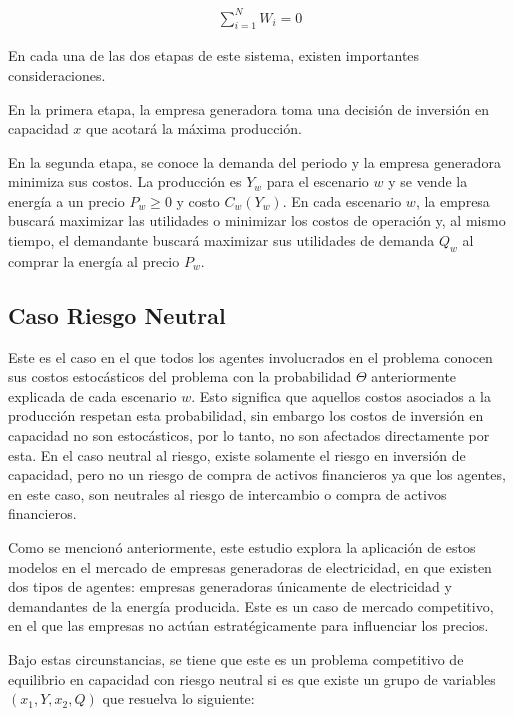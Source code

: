 \begin{align}
\sum_{i=1}^{N}W_{i} = 0    
\end{align}


En cada una de las dos etapas de este sistema, existen importantes consideraciones.
\vspace{2.5mm}

En la primera etapa, la empresa generadora toma una decisión de inversión en capacidad $x$ que acotará la máxima producción. 
\vspace{2.5mm}

En la segunda etapa, se conoce la demanda del periodo y la empresa generadora minimiza sus costos. La producción es $Y_{w}$ para el escenario $w$ y se vende la energía a un precio $P_{w}\geq 0$ y costo $C_{w}(Y_{w})$. En cada escenario $w$, la empresa buscará maximizar las utilidades o minimizar los costos de operación y, al mismo tiempo, el demandante buscará maximizar sus utilidades de demanda $Q_{w}$ al comprar la energía al precio $P_{w}$.

\subsection{Caso Riesgo Neutral}

Este es el caso en el que todos los agentes involucrados en el problema conocen sus costos estocásticos del problema con la probabilidad $\Theta$ anteriormente explicada de cada escenario $w$. Esto significa que aquellos costos asociados a la producción respetan esta probabilidad, sin embargo los costos de inversión en capacidad no son estocásticos, por lo tanto, no son afectados directamente por esta. En el caso neutral al riesgo, existe solamente el riesgo en inversión de capacidad, pero no un riesgo de compra de activos financieros ya que los agentes, en este caso, son neutrales al riesgo de intercambio o compra de activos financieros. 
\vspace{2.5mm}

Como se mencionó anteriormente, este estudio explora la aplicación de estos modelos en el mercado de empresas generadoras de electricidad, en que existen dos tipos de agentes: empresas generadoras únicamente de electricidad y demandantes de la energía producida. Este es un caso de mercado competitivo, en el que las empresas no actúan estratégicamente para influenciar los precios. 
\vspace{2.5mm}

Bajo estas circunstancias, se tiene que este es un problema competitivo de equilibrio en capacidad con riesgo neutral si es que existe un grupo de variables $(x_{1}, Y, x_{2}, Q)$ que resuelva lo siguiente: 

